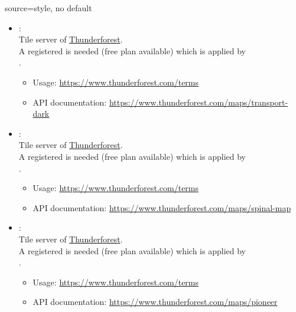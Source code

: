 \begin{docMrcKey}[supply]{source}{=}{style, no default}
\begin{itemize}
\clearpage
  \item{}:\\
    Tile server of \href{https://www.thunderforest.com}{Thunderforest}.\\
    A registered  is needed (free plan available)
    which is applied by\\
    .
    \begin{itemize}
    \item Usage: \url{https://www.thunderforest.com/terms}
    \item API documentation: \url{https://www.thunderforest.com/maps/transport-dark}
    \end{itemize}

  \item{}:\\
    Tile server of \href{https://www.thunderforest.com}{Thunderforest}.\\
    A registered  is needed (free plan available)
    which is applied by\\
    .
    \begin{itemize}
    \item Usage: \url{https://www.thunderforest.com/terms}
    \item API documentation: \url{https://www.thunderforest.com/maps/spinal-map}
    \end{itemize}

  \item{}:\\
    Tile server of \href{https://www.thunderforest.com}{Thunderforest}.\\
    A registered  is needed (free plan available)
    which is applied by\\
    .
    \begin{itemize}
    \item Usage: \url{https://www.thunderforest.com/terms}
    \item API documentation: \url{https://www.thunderforest.com/maps/pioneer}
    \end{itemize}


\end{itemize}
\end{docMrcKey}
